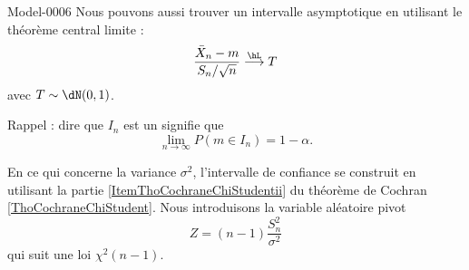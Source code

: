 \begin{corrige}{Model-0006}
    Nous pouvons aussi trouver un intervalle asymptotique en utilisant le théorème central limite :
    \begin{equation}
        \frac{ \bar X_n-m }{ S_n/\sqrt{n} }\stackrel{\hL}{\longrightarrow} T
    \end{equation}
    avec \( T\sim\dN(0,1)\). 

    Rappel : dire que \( I_n\) est un  signifie que
    \begin{equation}
        \lim_{n\to \infty} P(m\in I_n)= 1-\alpha.
    \end{equation}

    En ce qui concerne la variance \( \sigma^2\), l'intervalle de confiance se construit en utilisant la partie \ref{ItemThoCochraneChiStudentii} du théorème de Cochran \ref{ThoCochraneChiStudent}. Nous introduisons la variable aléatoire pivot
    \begin{equation}
        Z=(n-1)\frac{ S_n^2 }{ \sigma^2 }
    \end{equation}
    qui suit une loi \( \chi^2(n-1)\).
    

\end{corrige}
